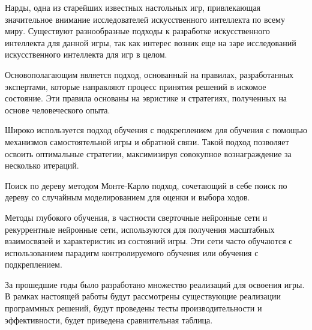 Нарды, одна из старейших известных настольных игр, привлекающая значительное внимание исследователей искусственного интеллекта по всему миру. Существуют разнообразные подходы к разработке искусственного интеллекта для данной игры, так как интерес возник еще на заре исследований искусственного интеллекта для игр в целом.

Основополагающим является подход, основанный на правилах, разработанных экспертами, которые направляют процесс принятия решений в искомое состояние. Эти правила основаны на эвристике и стратегиях, полученных на основе человеческого опыта.

Широко используется подход обучения с подкреплением для обучения с помощью механизмов самостоятельной игры и обратной связи. Такой подход позволяет освоить оптимальные стратегии, максимизируя совокупное вознаграждение за несколько итераций.

Поиск по дереву методом Монте-Карло подход, сочетающий в себе поиск по дереву со случайным моделированием для оценки и выбора ходов.

Методы глубокого обучения, в частности сверточные нейронные сети и рекуррентные нейронные сети, используются для получения масштабных взаимосвязей и характеристик из состояний игры. Эти сети часто обучаются с использованием парадигм контролируемого обучения или обучения с подкреплением.

За прошедшие годы было разработано множество реализаций для освоения игры. В рамках настоящей работы будут рассмотрены существующие реализации программных решений, будут проведены тесты производительности и эффективности, будет приведена сравнительная таблица.
